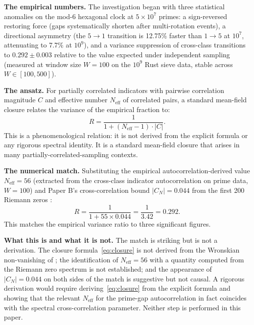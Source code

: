\documentclass[11pt,a4paper]{article}
\begin{document}
\textbf{The empirical numbers.} The investigation began with three statistical anomalies on the mod-6 hexagonal clock at $5 \times 10^7$ primes: a sign-reversed restoring force (gaps systematically shorten after multi-rotation events), a directional asymmetry (the $5 \to 1$ transition is 12.75\% faster than $1 \to 5$ at $10^7$, attenuating to 7.7\% at $10^9$), and a variance suppression of cross-class transitions to $0.292 \pm 0.003$ relative to the value expected under independent sampling (measured at window size $W = 100$ on the $10^9$ Rust sieve data, stable across $W \in [100, 500]$).

\textbf{The ansatz.} For partially correlated indicators with pairwise correlation magnitude $C$ and effective number $N_{\text{eff}}$ of correlated pairs, a standard mean-field closure relates the variance of the empirical fraction to:
\begin{equation}
R = \frac{1}{1 + (N_{\text{eff}} - 1) \cdot |C|}.
\label{eq:closure}
\end{equation}
This is a phenomenological relation: it is not derived from the explicit formula or any rigorous spectral identity. It is a standard mean-field closure that arises in many partially-correlated-sampling contexts.

\textbf{The numerical match.} Substituting the empirical autocorrelation-derived value $N_{\text{eff}} = 56$ (extracted from the cross-class indicator autocorrelation on prime data, $W = 100$) and Paper B's cross-correlation bound $|C_N| = 0.044$ from the first 200 Riemann zeros \cite{WallaceB}:
\begin{equation}
R = \frac{1}{1 + 55 \times 0.044} = \frac{1}{3.42} = 0.292.
\end{equation}
This matches the empirical variance ratio to three significant figures.

\textbf{What this is and what it is not.} The match is striking but is not a derivation. The closure formula~\eqref{eq:closure} is not derived from the Wronskian non-vanishing of \cite{WallaceB}; the identification of $N_{\text{eff}} = 56$ with a quantity computed from the Riemann zero spectrum is not established; and the appearance of $|C_N| = 0.044$ on both sides of the match is suggestive but not causal. A rigorous derivation would require deriving~\eqref{eq:closure} from the explicit formula and showing that the relevant $N_{\text{eff}}$ for the prime-gap autocorrelation in fact coincides with the spectral cross-correlation parameter. Neither step is performed in this paper.
\end{document}
